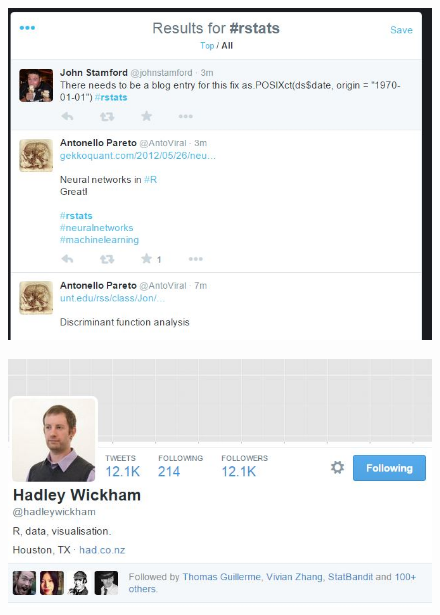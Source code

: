 \documentclass{beamer}
\begin{document}
\begin{frame}
	\begin{figure}
		\centering
		\includegraphics[width=0.88\linewidth]{twitterfeed}
		
	\end{figure}
	
\end{frame}
\begin{frame}
	\begin{figure}
		\centering
		\includegraphics[width=1.1\linewidth]{hadley}
		
	\end{figure}
	
\end{frame}
\end{document}
